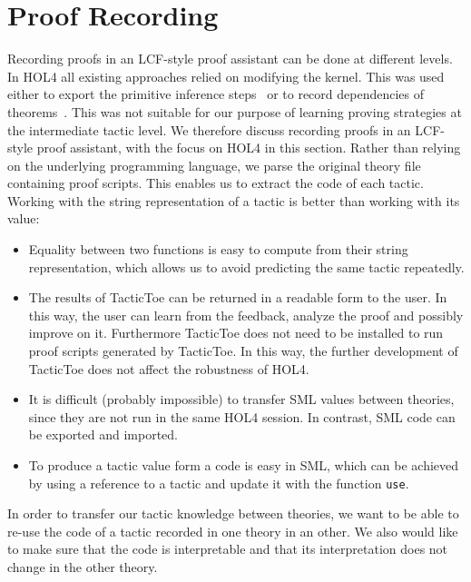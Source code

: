 \documentclass[runningheads,a4paper,draft]{svjour3}
\def\holfour{\textsf{HOL4}\xspace}
\def\sml{\textsf{SML}\xspace}
\def\tactictoe{\textsf{TacticToe}\xspace}
\begin{document}
\section{Proof Recording}\label{sec:recording}
Recording proofs in an LCF-style proof assistant can be done at different
levels.
In \holfour all existing approaches relied on modifying the kernel. This was
used
either to export the primitive inference
steps~\cite{Wong95recordingand,DBLP:conf/itp/KumarH12}
or to record dependencies of theorems~\cite{tgck-cpp15}. This was not suitable
for our
purpose of learning proving strategies at the intermediate tactic level. We
therefore
discuss recording proofs in an LCF-style proof assistant, with the focus on
\holfour
in this section.
%
Rather than relying on the underlying programming language, we parse the
original theory file containing proof scripts. This enables us to extract the
code of each tactic.
Working with the string representation of a tactic is better than working with
its value:
\begin{itemize}
\item Equality between two functions is easy to compute from
their string representation, which allows us to avoid
predicting the same tactic repeatedly.
\item
The
results of
\tactictoe can be returned in a readable form to the user. In this way, the
user can learn from the feedback, analyze the proof and possibly improve on it.
Furthermore \tactictoe does not need to be installed to run
proof scripts generated by \tactictoe. In this way, the further development of
\tactictoe does not affect the robustness of \holfour.
\item
It is difficult (probably impossible) to transfer \sml values
between theories, since they are not run in the same \holfour session. In contrast,
\sml code can be exported and imported.
\item To produce a tactic value form a code is easy in \sml, which can be
achieved by using a reference to a tactic and update it with the function
\texttt{use}.
\end{itemize}

In order to transfer our tactic knowledge between theories, we want to be able
to re-use the code of a tactic recorded in one theory in an
other. We also would like to make sure that the code is interpretable and that
its interpretation does not change in the other theory.
\end{document}
